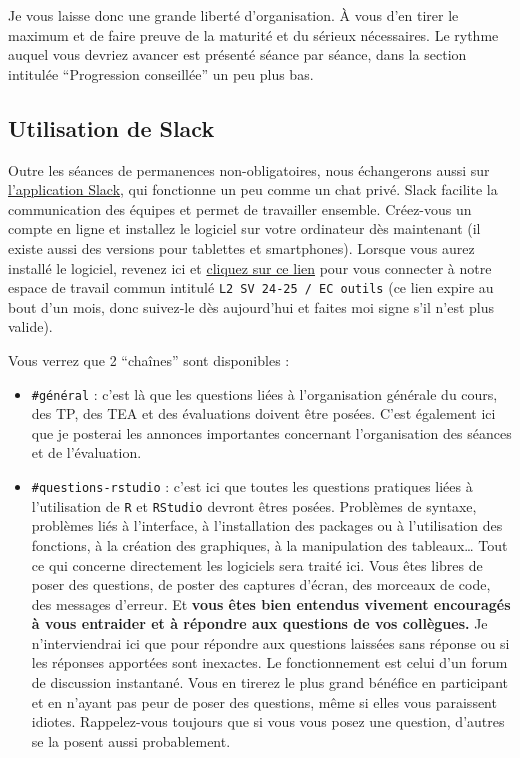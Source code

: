 \documentclass[
  a4paper,
  DIV=11,
  numbers=noendperiod,
  oneside]{scrreprt}
\providecommand{\tightlist}{%
  \setlength{\itemsep}{0pt}\setlength{\parskip}{0pt}}\usepackage{longtable,booktabs,array}
\begin{document}
Je vous laisse donc une grande liberté d'organisation. À vous d'en tirer
le maximum et de faire preuve de la maturité et du sérieux nécessaires.
Le rythme auquel vous devriez avancer est présenté séance par séance,
dans la section intitulée ``Progression conseillée'' un peu plus bas.

\subsection*{Utilisation de Slack}\label{utilisation-de-slack}

Outre les séances de permanences non-obligatoires, nous échangerons
aussi sur \href{https://slack.com/intl/fr-fr/}{l'application Slack}, qui
fonctionne un peu comme un chat privé. Slack facilite la communication
des équipes et permet de travailler ensemble. Créez-vous un compte en
ligne et installez le logiciel sur votre ordinateur dès maintenant (il
existe aussi des versions pour tablettes et smartphones). Lorsque vous
aurez installé le logiciel, revenez ici et
\href{https://join.slack.com/t/slack-yky3543/shared_invite/zt-2qdxev3hd-l9bA9LWXroLzP2xwr5FVhw}{cliquez
sur ce lien} pour vous connecter à notre espace de travail commun
intitulé \texttt{L2\ SV\ 24-25\ /\ EC\ outils} (ce lien expire au bout
d'un mois, donc suivez-le dès aujourd'hui et faites moi signe s'il n'est
plus valide).

Vous verrez que 2 ``chaînes'' sont disponibles :

\begin{itemize}
\tightlist
\item
  \texttt{\#général} : c'est là que les questions liées à l'organisation
  générale du cours, des TP, des TEA et des évaluations doivent être
  posées. C'est également ici que je posterai les annonces importantes
  concernant l'organisation des séances et de l'évaluation.
\item
  \texttt{\#questions-rstudio} : c'est ici que toutes les questions
  pratiques liées à l'utilisation de \texttt{R} et \texttt{RStudio}
  devront êtres posées. Problèmes de syntaxe, problèmes liés à
  l'interface, à l'installation des packages ou à l'utilisation des
  fonctions, à la création des graphiques, à la manipulation des
  tableaux\ldots{} Tout ce qui concerne directement les logiciels sera
  traité ici. Vous êtes libres de poser des questions, de poster des
  captures d'écran, des morceaux de code, des messages d'erreur. Et
  \textbf{vous êtes bien entendus vivement encouragés à vous entraider
  et à répondre aux questions de vos collègues.} Je n'interviendrai ici
  que pour répondre aux questions laissées sans réponse ou si les
  réponses apportées sont inexactes. Le fonctionnement est celui d'un
  forum de discussion instantané. Vous en tirerez le plus grand bénéfice
  en participant et en n'ayant pas peur de poser des questions, même si
  elles vous paraissent idiotes. Rappelez-vous toujours que si vous vous
  posez une question, d'autres se la posent aussi probablement.
\end{itemize}
\end{document}
